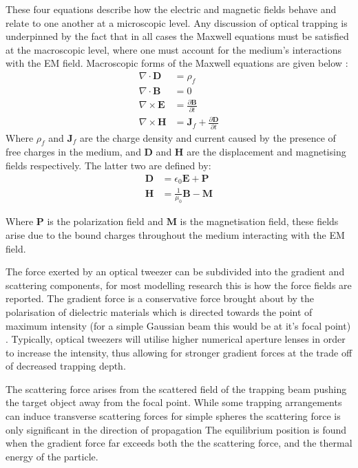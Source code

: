 These four equations describe how the electric and magnetic fields behave
and relate to one another at a microscopic level. Any discussion 
of optical trapping is underpinned by the fact that in all cases the 
Maxwell equations must be satisfied at the macroscopic level, where 
one must account for the medium's interactions with the EM field. 
Macroscopic forms of the Maxwell equations are given below \cite{Jackson_1975}:
\begin{align}
	\nabla \cdot \mathbf{D}
	&= \rho_f
	\\
	\nabla \cdot \mathbf{B}
	&= 0
	\\
	\nabla \times \mathbf{E}
	&= \frac{\partial \mathbf{B}}{\partial t}
	\\
	\nabla \times \mathbf{H}
	&= \mathbf{J}_f +\frac{\partial \mathbf{D}}{\partial t}  
\end{align}
Where $\rho_f$ and $\mathbf{J}_f$ are the charge density and current 
caused by the presence of free charges in the medium, and $\mathbf{D}$ 
and $\mathbf{H}$ are the displacement and magnetising fields respectively. 
The latter two are defined by:
\begin{align}
	\mathbf{D} &= \epsilon_0\mathbf{E}+\mathbf{P} 
	\\ 
	\mathbf{H} &= \frac{1}{\mu_0}\mathbf{B}-\mathbf{M}
\end{align}

Where $\mathbf{P}$ is the polarization field and $\mathbf{M}$ is the 
magnetisation field, these fields arise due to the bound charges 
throughout the medium interacting with the EM field. 

The force exerted by an optical tweezer can be subdivided into the 
gradient and scattering components, for most modelling research this 
is how the force fields are reported. The gradient force is a 
conservative force brought about by the polarisation of dielectric 
materials which is directed towards the point of maximum intensity 
(for a simple Gaussian beam this would be at it's focal point) 
\cite{YasuhiroHarada1996}. Typically, optical tweezers will utilise 
higher numerical aperture lenses in order to increase the intensity, 
thus allowing for stronger gradient forces at the trade off of 
decreased trapping depth.

The scattering force arises from the scattered field of the trapping 
beam pushing the target object away from the focal point. While some 
trapping arrangements can induce transverse scattering forces for 
simple spheres the scattering force is only significant in the direction
of propagation \cite{Capitanio2002} The equilibrium position is found 
when the gradient force far exceeds both the the scattering force, 
and the thermal energy of the particle. 

